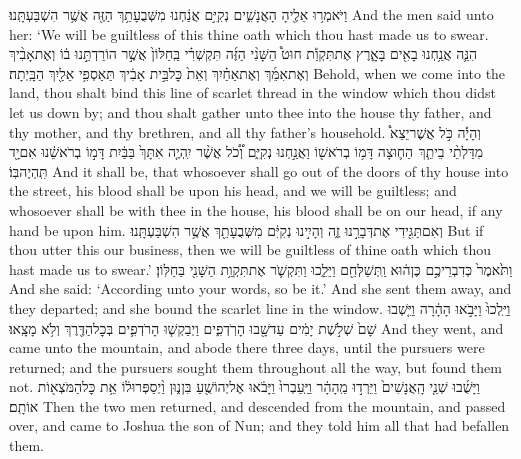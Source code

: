 {וַיֹּאמְר֥וּ אֵלֶ֖יהָ הָאֲנָשִׁ֑ים נְקִיִּ֣ם אֲנַ֔חְנוּ מִשְּׁבֻעָתֵ֥ךְ הַזֶּ֖ה אֲשֶׁ֥ר הִשְׁבַּעְתָּֽנוּ׃}
{And the men said unto her: ‘We will be guiltless of this thine oath which thou hast made us to swear.}
{הִנֵּ֛ה אֲנַ֥חְנוּ בָאִ֖ים בָּאָ֑רֶץ אֶת\maqqaf תִּקְוַ֡ת חוּט֩ הַשָּׁנִ֨י הַזֶּ֜ה תִּקְשְׁרִ֗י בַּֽחַלּוֹן֙ אֲשֶׁ֣ר הוֹרַדְתֵּ֣נוּ ב֔וֹ וְאֶת\maqqaf אָבִ֨יךְ וְאֶת\maqqaf אִמֵּ֜ךְ וְאֶת\maqqaf אַחַ֗יִךְ וְאֵת֙ כׇּל\maqqaf בֵּ֣ית אָבִ֔יךְ תַּאַסְפִ֥י אֵלַ֖יִךְ הַבָּֽיְתָה׃}
{Behold, when we come into the land, thou shalt bind this line of scarlet thread in the window which thou didst let us down by; and thou shalt gather unto thee into the house thy father, and thy mother, and thy brethren, and all thy father’s household.}
{וְהָיָ֡ה כֹּ֣ל אֲשֶׁר\maqqaf יֵצֵא֩ מִדַּלְתֵ֨י בֵיתֵ֧ךְ \pasek  הַח֛וּצָה דָּמ֥וֹ בְרֹאשׁ֖וֹ וַאֲנַ֣חְנוּ נְקִיִּ֑ם וְ֠כֹ֠ל אֲשֶׁ֨ר יִֽהְיֶ֤ה אִתָּךְ֙ בַּבַּ֔יִת דָּמ֣וֹ בְרֹאשֵׁ֔נוּ אִם\maqqaf יָ֖ד תִּֽהְיֶה\maqqaf בּֽוֹ׃}
{And it shall be, that whosoever shall go out of the doors of thy house into the street, his blood shall be upon his head, and we will be guiltless; and whosoever shall be with thee in the house, his blood shall be on our head, if any hand be upon him.}
{וְאִם\maqqaf תַּגִּ֖ידִי אֶת\maqqaf דְּבָרֵ֣נוּ זֶ֑ה וְהָיִ֣ינוּ נְקִיִּ֔ם מִשְּׁבֻעָתֵ֖ךְ אֲשֶׁ֥ר הִשְׁבַּעְתָּֽנוּ׃}
{But if thou utter this our business, then we will be guiltless of thine oath which thou hast made us to swear.’}
{וַתֹּ֙אמֶר֙ כְּדִבְרֵיכֶ֣ם כֶּן\maqqaf ה֔וּא וַֽתְּשַׁלְּחֵ֖ם וַיֵּלֵ֑כוּ וַתִּקְשֹׁ֛ר אֶת\maqqaf תִּקְוַ֥ת הַשָּׁנִ֖י בַּחַלּֽוֹן׃}
{And she said: ‘According unto your words, so be it.’ And she sent them away, and they departed; and she bound the scarlet line in the window.}
{וַיֵּֽלְכוּ֙ וַיָּבֹ֣אוּ הָהָ֔רָה וַיֵּ֤שְׁבוּ שָׁם֙ שְׁלֹ֣שֶׁת יָמִ֔ים עַד\maqqaf שָׁ֖בוּ הָרֹֽדְפִ֑ים וַיְבַקְשׁ֧וּ הָרֹדְפִ֛ים בְּכׇל\maqqaf הַדֶּ֖רֶךְ וְלֹ֥א מָצָֽאוּ׃}
{And they went, and came unto the mountain, and abode there three days, until the pursuers were returned; and the pursuers sought them throughout all the way, but found them not.}
{וַיָּשֻׁ֜בוּ שְׁנֵ֤י הָֽאֲנָשִׁים֙ וַיֵּרְד֣וּ מֵֽהָהָ֔ר וַיַּֽעַבְרוּ֙ וַיָּבֹ֔אוּ אֶל\maqqaf יְהוֹשֻׁ֖עַ בִּן\maqqaf נ֑וּן וַ֨יְסַפְּרוּ\maqqaf ל֔וֹ אֵ֥ת כׇּל\maqqaf הַמֹּצְא֖וֹת אוֹתָֽם׃}
{Then the two men returned, and descended from the mountain, and passed over, and came to Joshua the son of Nun; and they told him all that had befallen them.}
